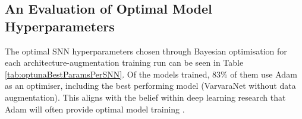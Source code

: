 
\subsection{An Evaluation of Optimal Model Hyperparameters}\label{ch:ID,sec:ModelSelection,subsec:paramEval}

The optimal SNN hyperparameters chosen through Bayesian optimisation for each architecture-augmentation training run can be seen in Table \ref{tab:optunaBestParamsPerSNN}. Of the models trained, 83\% of them use Adam \cite{kingma_adam:_2014} as an optimiser, including the best performing model (VarvaraNet without data augmentation). This aligns with the belief within deep learning research that Adam will often provide optimal model training \cite{karpathy_peek_2017}.

